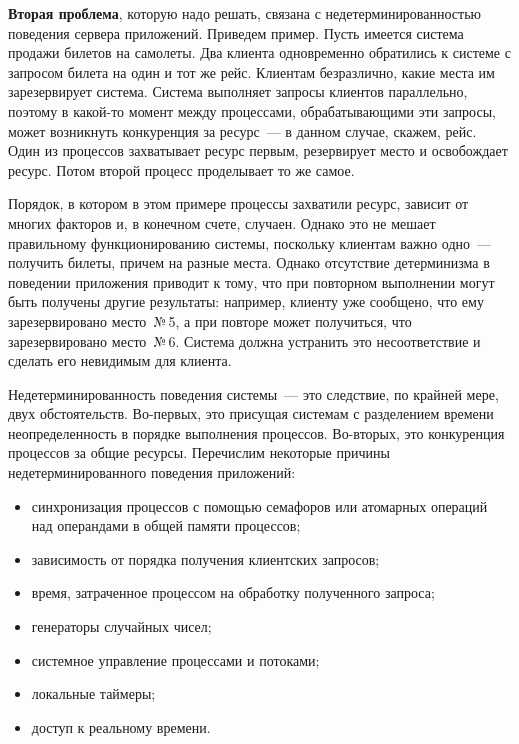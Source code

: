 \begin{multicols}{2}
{\textbf{Вторая проблема}, которую надо решать, связана с
недетерминированностью поведения сервера приложений. Приведем пример.
Пусть имеется сис\-те\-ма продажи билетов на самолеты. Два клиента
одновременно обратились к системе с запросом билета на один и тот же рейс.
Клиентам безразлично, какие места им зарезервирует сис\-тема. Сис\-те\-ма
выполняет запросы клиентов параллельно, поэтому в какой-то момент между
процессами, обрабатывающими эти запросы, может возникнуть конкуренция за
ресурс~--- в данном случае, скажем, рейс. Один из процессов захватывает
ресурс первым, резервирует место и освобождает ресурс. Потом второй
процесс проделывает то же самое.

Порядок, в котором в этом примере процессы захватили ресурс, зависит от
многих факторов и, в конечном счете, случаен. Однако  это не мешает
правильному функционированию сис\-те\-мы, поскольку клиентам важно одно~---
получить билеты, причем на разные места. Однако отсутствие детерминизма в
поведении  приложения приводит к тому, что при повторном выполнении могут
быть получены другие результаты: например, клиенту уже сообщено, что ему
зарезервировано место~№\,5, а при повторе может получиться, что
зарезервировано место~№\,6. Система должна устранить это несоответствие и
сделать его невидимым для клиента.

Недетерминированность поведения сис\-те\-мы~--- это следствие, по крайней мере,
двух обстоятельств. Во-первых, это присущая сис\-те\-мам с разделением времени
неопределенность в порядке выполнения процессов. Во-вторых, это
конкуренция процессов за общие ресурсы. Перечислим некоторые причины
недетерминированного поведения приложений:
{ %

}

\noindent
\begin{itemize}
\item синхронизация процессов с помощью семафоров или атомарных
операций над операндами в общей памяти процессов;
\item зависимость от порядка получения клиентских запросов;
\item время, затраченное процессом на обработку полученного запроса;
\item генераторы случайных чисел;
\item системное управление процессами и потоками;
\item локальные таймеры;
\item доступ к реальному времени.
\end{itemize}

}
\end{multicols}
